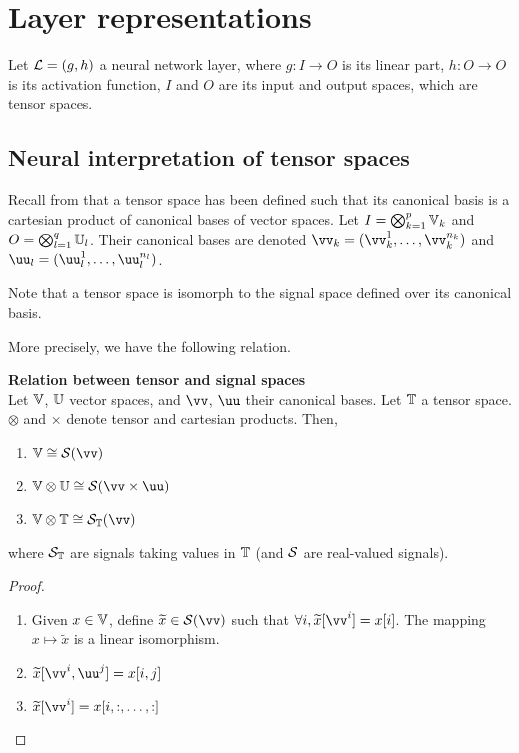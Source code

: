 \section{Layer representations}

Let $\mathcal{L} = (g,h)$ a neural network layer, where $g: I \rightarrow O$ is its linear part, $h : O \rightarrow O$ is its activation function, $I$ and $O$ are its input and output spaces, which are tensor spaces. 

\subsection{Neural interpretation of tensor spaces}

Recall from  that a tensor space has been defined such that its canonical basis is a cartesian product of canonical bases of vector spaces. Let $I = \bigotimes_{k=1}^p \mathbb{V}_k$ and $O =  \bigotimes_{l=1}^q \mathbb{U}_l$.
Their canonical bases are denoted $\vv_k = (\vv_k^1, \ldots, \vv_k^{n_k})$ and $\uu_l = (\uu_l^1, \ldots, \uu_l^{n_l})$.

\begin{remark}
Note that a tensor space is isomorph to the signal space defined over its canonical basis.
\end{remark}

More precisely, we have the following relation.

\begin{lemma}\textbf{Relation between tensor and signal spaces}\\
Let $\mathbb{V}$, $\mathbb{U}$ vector spaces, and $\vv$, $\uu$ their canonical bases. Let $\mathbb{T}$ a tensor space. $\otimes$ and $\times$ denote tensor and cartesian products. Then,
\begin{enumerate}[label=(\roman*)]
  \item $\bbv \cong \cs(\vv)$
  \item $\bbv \otimes \bbu \cong \cs(\vv \times \uu)$
  \item $\bbv \otimes \bbt \cong \cs_{\bbt}(\vv)$
\end{enumerate}
where $\mathcal{S}_{\mathbb{T}}$ are signals taking values in $\mathbb{T}$ (and $\mathcal{S}$ are real-valued signals).
\label{lem:relts}
\end{lemma}
\begin{proof}
\begin{enumerate}[label=(\roman*)]
  \item Given $x \in \mathbb{V}$, define $\widetilde{x} \in \cs(\vv)$ such that $\forall i, \widetilde{x}[\vv^i] = x[i]$. The mapping $x \mapsto \widetilde{x}$ is a linear isomorphism. \label{enum:li}
  \item $\widetilde{x}[\vv^i, \uu^j] = x[i,j]$
  \item $\widetilde{x}[\vv^i] = x[i,:,\ldots,:]$
\end{enumerate}
\end{proof}

